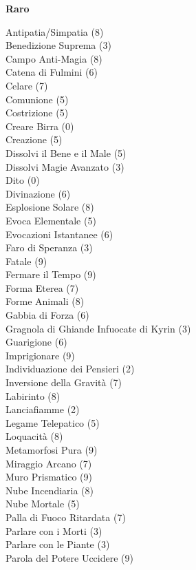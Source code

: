 \begin{multicols}{3}
{	\medskip\textbf{Raro}\medskip

	Antipatia/Simpatia (8)\\
	Benedizione Suprema (3)\\
	Campo Anti-Magia (8)\\
	Catena di Fulmini (6)\\
	Celare (7)\\
	Comunione (5)\\
	Costrizione (5)\\
	Creare Birra (0)\\
	Creazione (5)\\
	Dissolvi il Bene e il Male (5)\\
	Dissolvi Magie Avanzato (3)\\
	Dito (0)\\
	Divinazione (6)\\
	Esplosione Solare (8)\\
	Evoca Elementale (5)\\
	Evocazioni Istantanee (6)\\
	Faro di Speranza (3)\\
	Fatale (9)\\
	Fermare il Tempo (9)\\
	Forma Eterea (7)\\
	Forme Animali (8)\\
	Gabbia di Forza (6)\\
	Gragnola di Ghiande Infuocate di Kyrin (3)\\
	Guarigione (6)\\
	Imprigionare (9)\\
	Individuazione dei Pensieri (2)\\
	Inversione della Gravità (7)\\
	Labirinto (8)\\
	Lanciafiamme (2)\\
	Legame Telepatico (5)\\
	Loquacità (8)\\
	Metamorfosi Pura (9)\\
	Miraggio Arcano (7)\\
	Muro Prismatico (9)\\
	Nube Incendiaria (8)\\
	Nube Mortale (5)\\
	Palla di Fuoco Ritardata (7)\\
	Parlare con i Morti (3)\\
	Parlare con le Piante (3)\\
	Parola del Potere Uccidere (9)\\
}
\end{multicols}
